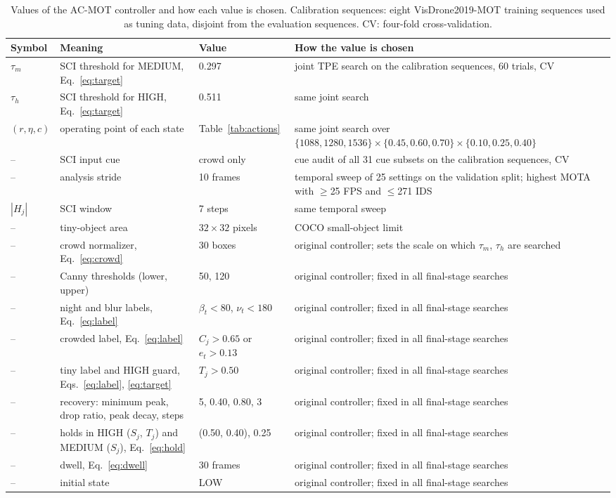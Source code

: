 \documentclass[journal]{new-aiaa}
\begin{document}
\begin{table}[htbp]
\caption{Values of the AC-MOT controller and how each value is chosen.
Calibration sequences: eight VisDrone2019-MOT training sequences used as
tuning data, disjoint from the evaluation sequences. CV: four-fold
cross-validation.}
\label{tab:constants}
\centering\footnotesize
\setlength{\tabcolsep}{4pt}
\begin{tabular}{@{}l>{\raggedright\arraybackslash}p{50mm}l>{\raggedright\arraybackslash}p{62mm}@{}}
\toprule
Symbol & Meaning & Value & How the value is chosen\\
\midrule
$\tau_m$ & SCI threshold for MEDIUM, Eq.~\eqref{eq:target} & 0.297 & joint TPE search on the calibration sequences, 60 trials, CV\\
$\tau_h$ & SCI threshold for HIGH, Eq.~\eqref{eq:target} & 0.511 & same joint search\\
$(r,\eta,c)$ & operating point of each state & Table~\ref{tab:actions} & same joint search over $\{1088,1280,1536\}\times\{0.45,0.60,0.70\}\times\{0.10,0.25,0.40\}$\\
-- & SCI input cue & crowd only & cue audit of all 31 cue subsets on the calibration sequences, CV\\
-- & analysis stride & 10 frames & temporal sweep of 25 settings on the validation split; highest MOTA with $\geq$25 FPS and $\leq$271 IDS\\
$|H_j|$ & SCI window & 7 steps & same temporal sweep\\
-- & tiny-object area & $32\times32$ pixels & COCO small-object limit \cite{lin2014coco}\\
-- & crowd normalizer, Eq.~\eqref{eq:crowd} & 30 boxes & original controller; sets the scale on which $\tau_m$, $\tau_h$ are searched\\
-- & Canny thresholds (lower, upper) & 50, 120 & original controller; fixed in all final-stage searches\\
-- & night and blur labels, Eq.~\eqref{eq:label} & $\beta_t<80$, $\nu_t<180$ & original controller; fixed in all final-stage searches\\
-- & crowded label, Eq.~\eqref{eq:label} & $C_j>0.65$ or $e_t>0.13$ & original controller; fixed in all final-stage searches\\
-- & tiny label and HIGH guard, Eqs.~\eqref{eq:label}, \eqref{eq:target} & $T_j>0.50$ & original controller; fixed in all final-stage searches\\
-- & recovery: minimum peak, drop ratio, peak decay, steps & 5, 0.40, 0.80, 3 & original controller; fixed in all final-stage searches\\
-- & holds in HIGH ($S_j$, $T_j$) and MEDIUM ($S_j$), Eq.~\eqref{eq:hold} & (0.50, 0.40), 0.25 & original controller; fixed in all final-stage searches\\
-- & dwell, Eq.~\eqref{eq:dwell} & 30 frames & original controller; fixed in all final-stage searches\\
-- & initial state & LOW & original controller; fixed in all final-stage searches\\
\bottomrule
\end{tabular}
\end{table}
\end{document}
